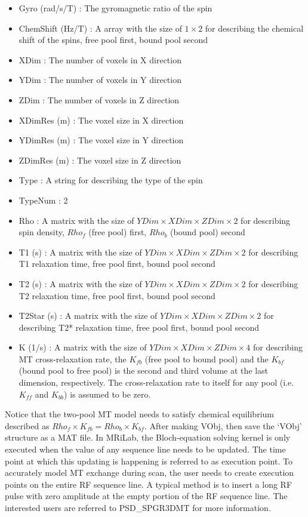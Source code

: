 \documentclass{book}%
\begin{document}
\begin{enumerate}
\begin{itemize}
	\item Gyro (rad/s/T) : The gyromagnetic ratio of the spin
	\item ChemShift (Hz/T) : A array with the size of $1 \times 2 $ for describing the chemical shift of the spins, free pool first, bound pool second
	\item XDim : The number of voxels in X direction
	\item YDim : The number of voxels in Y direction
	\item ZDim : The number of voxels in Z direction
	\item XDimRes (m) : The voxel size in X direction
	\item YDimRes (m) : The voxel size in Y direction
	\item ZDimRes (m) : The voxel size in Z direction
	\item Type : A string for describing the type of the spin
	\item TypeNum : 2
	\item Rho : A matrix with the size of $ YDim \times XDim \times ZDim \times 2 $ for describing spin density, $Rho_{f}$ (free pool) first, $Rho_{b}$ (bound pool) second
	\item T1 (s) : A matrix with the size of $ YDim \times XDim \times ZDim \times 2 $ for describing T1 relaxation time, free pool first, bound pool second
	\item T2 (s) : A matrix with the size of $ YDim \times XDim \times ZDim \times 2 $ for describing T2 relaxation time, free pool first, bound pool second
	\item T2Star (s) : A matrix with the size of $ YDim \times XDim \times ZDim \times 2 $ for describing T2* relaxation time, free pool first, bound pool second
	\item K (1/s) : A matrix with the size of $ YDim \times XDim \times ZDim \times 4 $ for describing MT cross-relaxation rate, the $K_{fb}$ (free pool to bound pool) and the $K_{bf}$ (bound pool to free pool) is the second and third volume at the last dimension, respectively. The cross-relaxation rate to itself for any pool (i.e. $K_{ff}$ and $K_{bb}$) is assumed to be zero.
\end{itemize}

Notice that the two-pool MT model needs to satisfy chemical equilibrium described as $Rho_{f} \times K_{fb} = Rho_{b} \times K_{bf}$. After making VObj, then save the `VObj' structure as a MAT file. In MRiLab, the Bloch-equation solving kernel is only executed when the value of any sequence line needs to be updated. The time point at which this updating is happening is referred to as execution point. To accurately model MT exchange during scan, the user needs to create execution points on the entire RF sequence line. A typical method is to insert a long RF pulse with zero amplitude at the empty portion of the RF sequence line. The interested users are referred to PSD\_SPGR3DMT for more information.


\end{enumerate}
\end{document}
